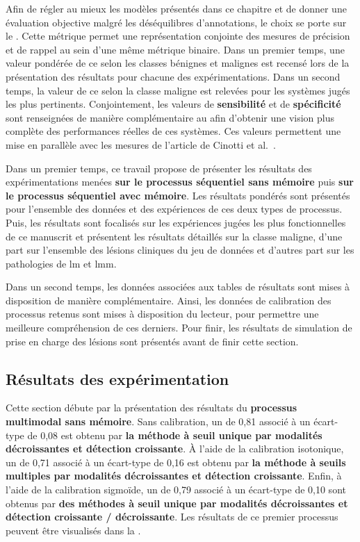 Afin de régler au mieux les modèles présentés dans ce chapitre et de donner une évaluation objective malgré les déséquilibres d'annotations, le choix se porte sur le \textbf{\fscore{}}. Cette métrique permet une représentation conjointe des mesures de précision et de rappel au sein d'une même métrique binaire. Dans un premier temps, une valeur pondérée de ce \fscore{} selon les classes bénignes et malignes est recensé lors de la présentation des résultats pour chacune des expérimentations. Dans un second temps, la valeur de ce \fscore{} selon la classe maligne est relevées pour les systèmes jugés les plus pertinents. Conjointement, les valeurs de \textbf{sensibilité} et de \textbf{spécificité} sont renseignées de manière complémentaire au \fscore{} afin d'obtenir une vision plus complète des performances réelles de ces systèmes. Ces valeurs permettent une mise en parallèle avec les mesures de l'article de Cinotti et al.~\cite{Cinotti2016}.\par

Dans un premier temps, ce travail propose de présenter les résultats des expérimentations menées \textbf{sur le processus séquentiel sans mémoire} puis \textbf{sur le processus séquentiel avec mémoire}. Les résultats pondérés sont présentés pour l'ensemble des données et des expériences de ces deux types de processus. Puis, les résultats sont focalisés sur les expériences jugées les plus fonctionnelles de ce manuscrit et présentent les résultats détaillés sur la classe maligne, d'une part sur l'ensemble des lésions cliniques du jeu de données et d'autres part sur les pathologies de \gls{lm} et \gls{lmm}.\par

Dans un second temps, les données associées aux tables de résultats sont mises à disposition de manière complémentaire. Ainsi, les données de calibration des processus retenus sont mises à disposition du lecteur, pour permettre une meilleure compréhension de ces derniers. Pour finir, les résultats de simulation de prise en charge des lésions sont présentés avant de finir cette section.\par
\clearpage

\subsection{Résultats des expérimentation}
Cette section débute par la présentation des résultats du \textbf{processus multimodal sans mémoire}. Sans calibration, un \fscore{} de 0,81 associé à un écart-type de 0,08 est obtenu par \textbf{la méthode à seuil unique par modalités décroissantes et détection croissante}. À l'aide de la calibration isotonique, un \fscore{} de 0,71 associé à un écart-type de 0,16 est obtenu par \textbf{la méthode à seuils multiples par modalités décroissantes et détection croissante}. Enfin, à l'aide de la calibration sigmoïde, un \fscore{} de 0,79 associé à un écart-type de 0,10 sont obtenus par \textbf{des méthodes à seuil unique par modalités décroissantes et détection croissante / décroissante}. Les résultats de ce premier processus peuvent être visualisés dans la .\par

